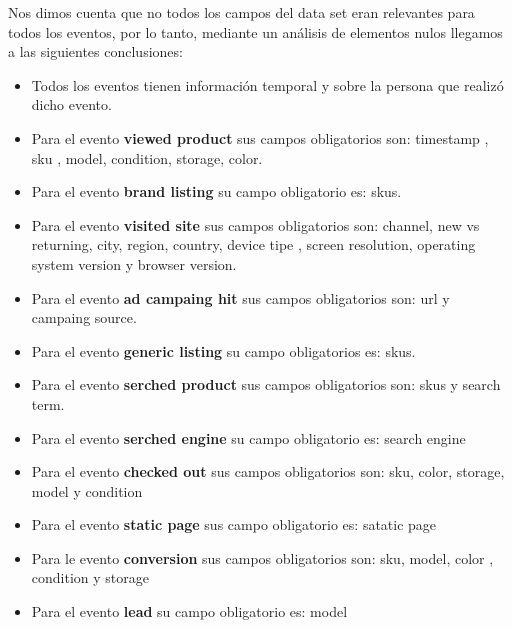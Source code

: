 \documentclass[titlepage,a4paper]{article}
\begin{document}
	Nos dimos cuenta que no todos los campos del data set eran relevantes para todos los eventos, por lo tanto, mediante un análisis de elementos nulos llegamos a las siguientes conclusiones: 
	\begin{itemize}
	
		\item Todos los eventos tienen información temporal y sobre la persona que realizó dicho evento. 
		\item Para el evento \textbf{viewed product} sus campos obligatorios son: timestamp , sku , model, condition, storage, color.
		\item Para el evento \textbf{brand listing} su campo obligatorio es: skus. 
		\item Para el evento \textbf{visited site} sus campos obligatorios son: channel, new vs returning, city, region, country, device tipe , screen resolution, operating system version y browser version.
		\item Para el evento \textbf{ad campaing hit} sus campos obligatorios son: url  y campaing source.
		\item Para el evento \textbf{generic listing} su campo obligatorios es: skus.
		\item Para el evento  \textbf{serched product } sus campos obligatorios son: skus y search term.
		\item Para el evento \textbf{serched engine} su campo obligatorio es: search engine
		\item Para el evento \textbf{checked out}  sus campos obligatorios son: sku, color, storage, model y condition 
		\item Para el evento \textbf{static page}  sus campo obligatorio es: satatic page
		\item Para le evento \textbf{conversion} sus campos obligatorios son:  sku, model, color , condition y storage
		\item Para el evento \textbf{lead} su campo obligatorio es: model

	\end{itemize}	
	
\end{document}

